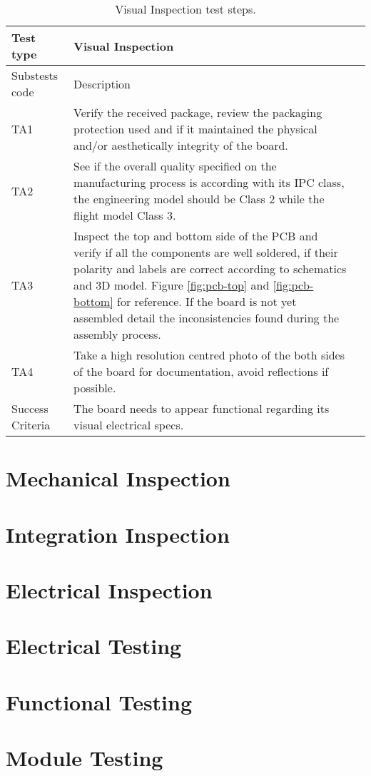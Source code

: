 \begin{table}[!htb]
\centering
\caption{Visual Inspection test steps.}
\label{tab:visual-inspection}
\begin{tabular}{m{3cm} m{12cm} m{3cm}}
\toprule
Test type & Visual Inspection \\
\midrule
\midrule
Substests code & Description \\ 
\midrule
TA1 & Verify the received package, review the packaging protection used and if it maintained the physical and/or aesthetically integrity of the board. \\
\midrule
TA2 & See if the overall quality specified on the manufacturing process is according with its IPC class, the engineering model should be Class 2 while the flight model Class 3. \\
\midrule
TA3 & Inspect the top and bottom side of the PCB and verify if all the components are well soldered, if their polarity and labels are correct according to schematics and 3D model. Figure \ref{fig:pcb-top} and \ref{fig:pcb-bottom} for reference. If the board is not yet assembled detail the inconsistencies found during the assembly process. \\
\midrule
TA4 & Take a high resolution centred photo of the both sides of the board for documentation, avoid reflections if possible. \\
\midrule
Success Criteria & The board needs to appear functional regarding its visual electrical specs. \\
\bottomrule
\end{tabular}
\end{table}

\section {Mechanical Inspection}

\section{Integration Inspection}

\section {Electrical Inspection}

\section {Electrical Testing}

\section {Functional Testing}
 
\section {Module Testing}
